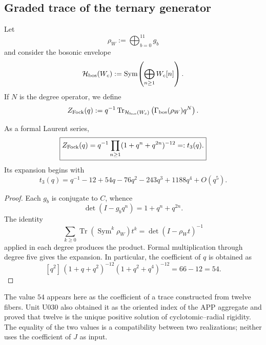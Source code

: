 \subsection{Graded trace of the ternary generator}

Let
\[
 \rho_W:=\bigoplus_{b=0}^{11}g_b
\]
and consider the bosonic envelope
\begin{equation}
 \mathcal H_{\rm bos}(W_c)
 :=
 \operatorname{Sym}\!\left(
 \bigoplus_{n\ge1}W_c[n]
 \right).
 \label{p12-83-c20-s8:eq:fock-bosonico-doce-fibras-u031}
\end{equation}
If \(N\) is the degree operator, we define
\begin{equation}
 Z_{\rm Fock}(q)
 :=
 q^{-1}\operatorname{Tr}_{\mathcal H_{\rm bos}(W_c)}
 \left(\Gamma_{\rm bos}(\rho_W)q^N\right).
 \label{p12-83-c20-s8:eq:traza-graduada-fock-u031}
\end{equation}

\begin{proposition}
\label{p12-83-c20-s8:prop:producto-tres-doce-fibras-u031}
As a formal Laurent series,
\begin{equation}
 \boxed{
 Z_{\rm Fock}(q)
 =q^{-1}\prod_{n\ge1}(1+q^n+q^{2n})^{-12}
 =:t_3(q).}
 \label{p12-83-c20-s8:eq:t3-producto-u031}
\end{equation}
Its expansion begins with
\begin{equation}
 t_3(q)
 =q^{-1}-12+54q-76q^2-243q^3+1188q^4+O(q^5).
 \label{p12-83-c20-s8:eq:t3-expansion-u031}
\end{equation}
\end{proposition}

\begin{proof}
Each \(g_b\) is conjugate to \(C\), whence
\[
 \det(I-g_bq^n)=1+q^n+q^{2n}.
\]
The identity
\[
 \sum_{k\ge0}
 \operatorname{Tr}(\operatorname{Sym}^k\rho_W)t^k
 =\det(I-\rho_Wt)^{-1}
\]
applied in each degree produces the product. Formal multiplication through
degree five gives the expansion. In particular, the coefficient of \(q\) is
obtained as
\[
 [q^2]\,
 (1+q+q^2)^{-12}(1+q^2+q^4)^{-12}
 =66-12=54.
\]
\end{proof}

The value \(54\) appears here as the coefficient of a trace constructed from
twelve fibers. Unit U030 also obtained it as the oriented index of the
APP aggregate and proved that twelve is the unique positive solution of
cyclotomic--radial rigidity. The equality of the two values is a compatibility
between two realizations; neither uses the coefficient of \(J\) as input.

